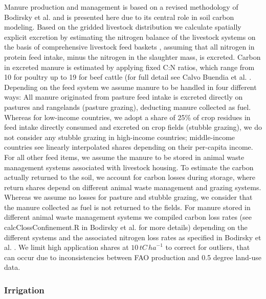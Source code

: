 \documentclass[gc, manuscript]{copernicus}
\begin{document}
Manure production and management is based on a revised methodology of Bodirsky et al. \citeyearpar{bodirsky_n2o_2012} and is presented here due to its central role in soil carbon modeling. Based on the gridded livestock distribution we calculate spatially explicit excretion by estimating the nitrogen balance of the livestock systems on the basis of comprehensive livestock feed baskets \citep{weindl_livestock_2017}, assuming that all nitrogen in protein feed intake, minus the nitrogen in the slaughter mass, is excreted. Carbon in excreted manure is estimated by applying fixed C:N ratios, which range from 10 for poultry up to 19 for beef cattle (for full detail see Calvo Buendia et al. \citeyearpar{ogle_cropland_in_ipcc_2019}.
Depending on the feed system we assume manure to be handled in four different ways:
All manure originated from pasture feed intake is excreted directly on pastures and rangelands (pasture grazing), deducting manure collected as fuel.
Whereas for low-income countries, we adopt a share of 25\% of crop residues in feed intake directly consumed and excreted on crop fields (stubble grazing), we do not consider any stubble grazing in high-income countries; middle-income countries see linearly interpolated shares depending on their per-capita income.
For all other feed items, we assume the manure to be stored in animal waste management systems associated with livestock housing.
To estimate the carbon actually returned to the soil, we account for carbon losses during storage, where return shares depend on different animal waste management and grazing systems. Whereas we assume no losses for pasture and stubble grazing, we consider that the manure collected as fuel is not returned to the fields. For manure stored in different animal waste management systems we compiled carbon loss rates (see calcClossConfinement.R in Bodirsky et al. \citeyearpar{bodirsky_mrcommons_2020} for more details) depending on the different systems and the associated nitrogen loss rates as specified in Bodirsky et al. \citeyearpar{bodirsky_n2o_2012}. We limit high application shares at \(10\,\unit{tC\,ha}^{-1}\) to correct for outliers, that can occur due to inconsistencies between FAO production and 0.5 degree land-use data.

\hypertarget{sec:irrigation}{%
\subsubsection{Irrigation}\label{sec:irrigation}}
\end{document}
